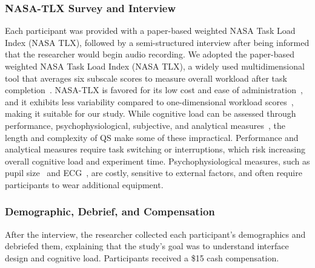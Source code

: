 \subsubsection{NASA-TLX Survey and Interview}
Each participant was provided with a paper-based weighted NASA Task Load Index (NASA TLX), followed by a semi-structured interview after being informed that the researcher would begin audio recording. We adopted the paper-based weighted NASA Task Load Index (NASA TLX), a widely used multidimensional tool that averages six subscale scores to measure overall workload after task completion~\cite{hart1988development, hartNasaTaskLoadIndex2006, cain2007review}. NASA-TLX is favored for its low cost and ease of administration~\cite{gaoMentalWorkloadMeasurement2013}, and it exhibits less variability compared to one-dimensional workload scores~\cite{rubioEvaluationSubjectiveMental2004}, making it suitable for our study. While cognitive load can be assessed through performance, psychophysiological, subjective, and analytical measures~\cite{gaoMentalWorkloadMeasurement2013}, the length and complexity of QS make some of these impractical. Performance and analytical measures require task switching or interruptions, which risk increasing overall cognitive load and experiment time. Psychophysiological measures, such as pupil size~\cite{palinkoEstimatingCognitiveLoad2010} and ECG~\cite{haapalainenPsychophysiologicalMeasuresAssessing2010}, are costly, sensitive to external factors, and often require participants to wear additional equipment.

\subsubsection{Demographic, Debrief, and Compensation}
After the interview, the researcher collected each participant's demographics and debriefed them, explaining that the study's goal was to understand interface design and cognitive load. Participants received a \$15 cash compensation.





